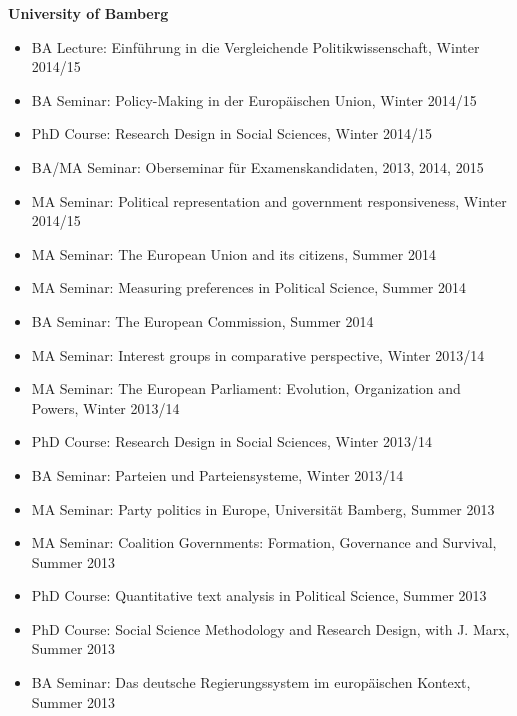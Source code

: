 \vspace{\baselineskip}

\textbf{University of Bamberg}
\begin{itemize}[topsep=0pt, noitemsep, leftmargin=3]
	\item BA Lecture: Einführung in die Vergleichende Politikwissenschaft,  Winter 2014/15
	\item BA Seminar: Policy-Making in der Europäischen Union, Winter 2014/15
	\item PhD Course: Research Design in Social Sciences, Winter 2014/15
	\item BA/MA Seminar: Oberseminar für Examenskandidaten, 2013, 2014, 2015
	\item MA Seminar: Political representation and government responsiveness, Winter 2014/15
	\item MA Seminar: The European Union and its citizens, Summer 2014
	\item MA Seminar: Measuring preferences in Political Science, Summer 2014
	\item BA Seminar: The European Commission, Summer 2014
	\item MA Seminar: Interest groups in comparative perspective, Winter 2013/14
	\item MA Seminar: The European Parliament: Evolution, Organization and Powers, Winter 2013/14
	\item PhD Course: Research Design in Social Sciences, Winter 2013/14
	\item BA Seminar: Parteien und Parteiensysteme, Winter 2013/14
	\item MA Seminar: Party politics in Europe, Universität Bamberg, Summer 2013
	\item MA Seminar: Coalition Governments: Formation, Governance and Survival, Summer 2013
	\item PhD Course: Quantitative text analysis in Political Science, Summer 2013
	\item PhD Course: Social Science Methodology and Research Design, with J. Marx, Summer 2013
	\item BA Seminar: Das deutsche Regierungssystem im europäischen Kontext,  Summer 2013
\end{itemize}

\vspace{\baselineskip}

